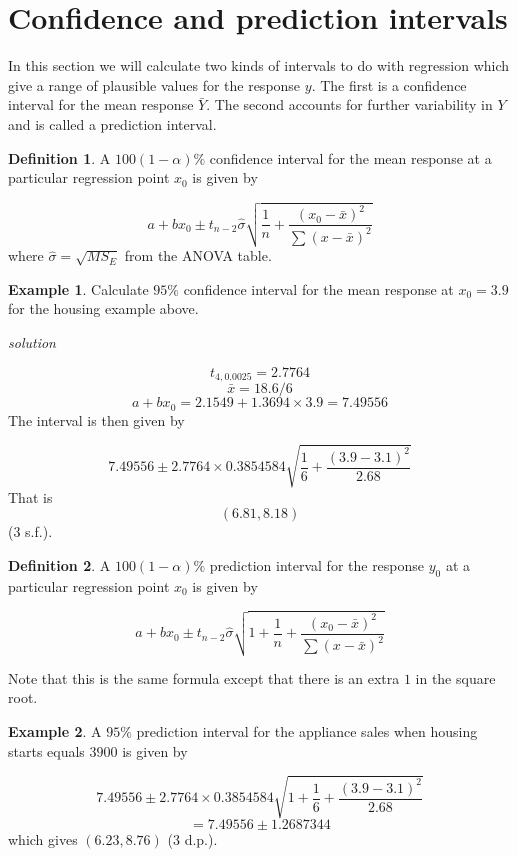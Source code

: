 \documentclass[
]{book}
\theoremstyle{definition}
\newtheorem{definition}{Definition}[chapter]
\theoremstyle{definition}
\newtheorem{example}{Example}[chapter]
\theoremstyle{definition}
\theoremstyle{definition}
\theoremstyle{remark}
\begin{document}
\hypertarget{confidence-and-prediction-intervals}{%
\section{Confidence and prediction intervals}\label{confidence-and-prediction-intervals}}

In this section we will calculate two kinds of intervals to do with regression which give a range of plausible values for the response \(y\). The first is a confidence interval for the mean response \(\bar{Y}\). The second accounts for further variability in \(Y\) and is called a prediction interval.

\begin{definition}
A \(100(1-\alpha)\%\) confidence interval for the mean response at a particular regression point \(x_0\) is given by

\[a+bx_0 \pm t_{n-2}\hat{\sigma}\sqrt{\frac{1}{n}+ \frac{(x_0-\bar{x})^2}{\sum(x-\bar{x})^2}}\]
where \(\hat{\sigma}=\sqrt{MS_E}\) from the ANOVA table.
\end{definition}

\begin{example}
Calculate \(95\%\) confidence interval for the mean response at \(x_0 = 3.9\) for the housing example above.

\emph{solution}

\[t_{4,0.0025}=2.7764\]
\[\bar{x} = 18.6/6\]
\[a+bx_0 = 2.1549 + 1.3694 \times 3.9 = 7.49556\]
The interval is then given by

\[7.49556 \pm 2.7764\times0.3854584\sqrt{\frac{1}{6}+\frac{(3.9 - 3.1)^2}{2.68}}\]
That is \[(6.81,8.18)\] (3 s.f.).
\end{example}

\begin{definition}
A \(100(1-\alpha)\%\) prediction interval for the response \(y_0\) at a particular regression point \(x_0\) is given by

\[a+bx_0 \pm t_{n-2}\hat{\sigma}\sqrt{1+\frac{1}{n}+ \frac{(x_0-\bar{x})^2}{\sum(x-\bar{x})^2}}\]
\end{definition}

Note that this is the same formula except that there is an extra \(1\) in the square root.

\begin{example}
A \(95\%\) prediction interval for the appliance sales when housing starts equals \(3900\) is given by

\[7.49556 \pm 2.7764\times0.3854584\sqrt{1+\frac{1}{6}+\frac{(3.9 - 3.1)^2}{2.68}}\]
\[=7.49556\pm 1.2687344\]
which gives \((6.23,8.76)\) (3 d.p.).
\end{example}
\end{document}
